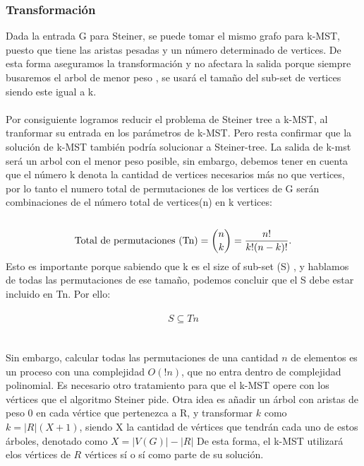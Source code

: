 \documentclass[spanish,12pt]{elsarticle}
\begin{document}
\subsubsection{Transformación}
\textnormal{Dada la entrada G para Steiner, se puede tomar el mismo grafo para k-MST, puesto que tiene las aristas pesadas y un número determinado de vertices. De esta forma aseguramos la transformación y no afectara la salida porque siempre busaremos el arbol de menor peso , se usará el tamaño del sub-set de vertices siendo este igual a k.}\\\\
\textnormal{Por consiguiente logramos reducir el problema de Steiner tree a k-MST, al tranformar su entrada en los parámetros de k-MST. Pero resta confirmar que la solución de k-MST también podría solucionar a Steiner-tree. La salida de k-mst será un arbol con el menor peso posible, sin embargo, debemos tener en cuenta que el número k denota la cantidad de vertices necesarios más no que vertices, por lo tanto el numero total de permutaciones de los vertices de G serán combinaciones de el número total de vertices(n) en k vertices:}\\\\
\textit{
\[
\textnormal{Total~de~permutaciones (Tn)}= \binom{n}{k} = \frac{n!}{k!(n - k)! }.
\]
}
\textnormal{Esto es importante porque sabiendo que k es el size of sub-set (S) , y hablamos de todas las permutaciones de ese tamaño, podemos concluir que el S debe estar incluido en Tn. Por ello:  }\\\\
\textit{
\[
S \subseteq Tn
\]
}\\\\
Sin embargo, calcular todas las permutaciones de una cantidad $n$ de elementos es un proceso con una complejidad $O(!n)$, que no entra dentro de complejidad polinomial. Es necesario otro tratamiento para que el k-MST opere con los vértices que el algoritmo Steiner pide. Otra idea es añadir un árbol con aristas de peso 0 en cada vértice que pertenezca a R, y transformar $k$ como $k = |R|(X+1)$, siendo X la cantidad de vértices que tendrán cada uno de estos árboles, denotado como $X = |V(G)|-|R|$ De esta forma, el k-MST utilizará elos vértices de $R$ vértices sí o sí como parte de su solución.
\\\\ 
\end{document}
